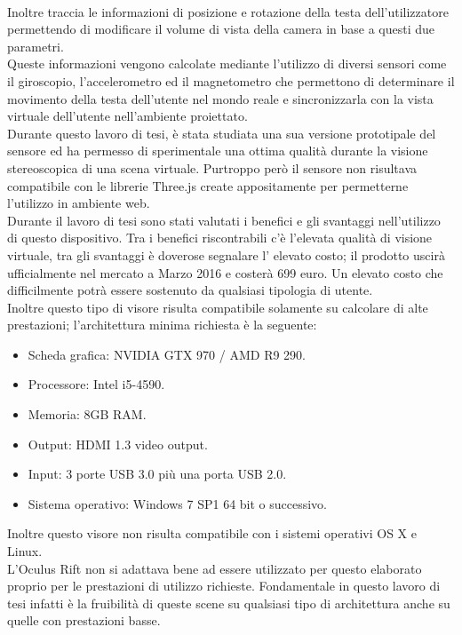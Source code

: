 \\
Inoltre traccia le informazioni di posizione e rotazione della testa dell’utilizzatore permettendo di modificare il volume di vista della camera in base a questi due parametri.
\\
Queste informazioni vengono calcolate mediante l’utilizzo di diversi sensori come il giroscopio, l’accelerometro ed il magnetometro che permettono di determinare il movimento della testa dell’utente nel mondo reale e sincronizzarla con la vista virtuale dell’utente nell’ambiente proiettato.
\\
Durante questo lavoro di tesi, è stata studiata una sua versione prototipale del sensore ed ha permesso di sperimentale una ottima qualità durante la visione stereoscopica di una scena virtuale. Purtroppo però il sensore non risultava compatibile con le librerie Three.js create appositamente per permetterne l'utilizzo in ambiente web.
\\
Durante il lavoro di tesi sono stati valutati i benefici e gli svantaggi nell’utilizzo di questo dispositivo. Tra i benefici riscontrabili c’è l’elevata qualità di visione virtuale, tra gli svantaggi è doverose segnalare l’ elevato costo; il prodotto uscirà ufficialmente nel mercato a Marzo 2016 e costerà 699 euro.
Un elevato costo che difficilmente potrà essere sostenuto da qualsiasi tipologia di utente.
\\
Inoltre questo tipo di visore risulta compatibile solamente su calcolare di alte prestazioni; l’architettura minima richiesta è la seguente:
\begin{itemize}
\item Scheda grafica: NVIDIA GTX 970 / AMD R9 290.
\item Processore: Intel i5-4590.
\item Memoria: 8GB RAM.
\item Output: HDMI 1.3 video output.
\item Input: 3 porte USB 3.0 più una porta USB 2.0.
\item Sistema operativo: Windows 7 SP1 64 bit o successivo.
\end{itemize}
Inoltre questo visore non risulta compatibile con i sistemi operativi OS X e Linux.
\\
L’Oculus Rift non si adattava bene ad essere utilizzato per questo elaborato proprio per le prestazioni di utilizzo richieste. Fondamentale in questo lavoro di tesi infatti è la fruibilità di queste scene su qualsiasi tipo di architettura anche su quelle con prestazioni basse.
\\
